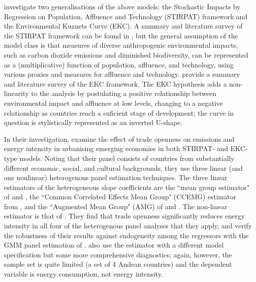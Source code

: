 \documentclass[12pt,a4paper]{article}
\begin{document}
\cite{rafiqUrbanizationOpennessEmissions2016} investigate two generalisations of the above models: the Stochastic Impacts by Regression on Population, Affluence and Technology (STIRPAT) framework and the Environmental Kuznets Curve (EKC).
A summary and literature survey of the STIRPAT framework can be found in \cite{mcgeeImpactsTechnologyReevaluation2015}, but the general assumption of the model class is that measures of diverse anthropogenic environmental impacts, such as carbon dioxide emissions and diminished biodiversity, can be represented as a (multiplicative) function of population, affluence, and technology, using various proxies and measures for affluence and technology.
\cite{dindaEnvironmentalKuznetsCurve2004} provide a summary and literature survey of the EKC framework. 
The EKC hypothesis adds a non-linearity to the analysis by postulating a positive relationship between environmental impact and affluence at low levels, changing to a negative relationship as countries reach a suficient stage of development; the curve in question is stylistically represented as an inverted U-shape.

In their investigation, \cite{rafiqUrbanizationOpennessEmissions2016} examine the effect of trade openness on emissions and energy intensity in urbanising emerging economies in both STIRPAT- and EKC-type models.
Noting that their panel consists of countries from substantially different economic, social,
and cultural backgrounds, they use three linear (and one nonlinear) heterogenous panel estimation techniques.
The three linear estimators of the heterogeneous slope coefficients are the ``mean group estimator" of \cite{pesaranRoleEconomicTheory1997} and \cite{pesaranEstimatingLongrunRelationships1995}, the ``Common Correlated Effects Mean Group" (CCEMG) estimator from \cite{pesaranEstimationInferenceLarge2006}, 
and the ``Augmented Mean Group" (AMG) of \cite{eberhardtCrosssectionDependenceNonstationary2009} and \cite{eberhardtProductivityAnalysisGlobal2010}.
The non-linear estimator is that of \cite{kapetaniosNonlinearPanelData2014}.
They find that trade openness significantly reduces energy intensity in all four of the heterogenous panel
analyses that they apply, and verify the robustness of their results against endogeneity among the regressors with the GMM panel estimation of \cite{arellanoTestsSpecificationPanel1991}.
\cite{koengkanPositiveImpactTrade2018} also use the \cite{arellanoTestsSpecificationPanel1991} estimator with a different model specification but some more comprehensive diagnostics; again, however, the sample set is quite limited (a set of 4 Andean countries) and the dependent variable is energy consumption, not energy intensity.
\end{document}
